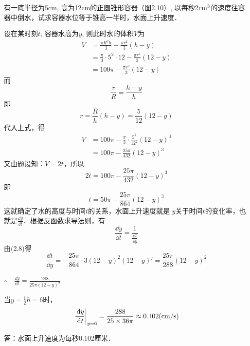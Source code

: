 \begin{example}
有一底半径为5cm, 高为12cm的正圆锥形容器（图2.10）, 以每秒2$\rm cm^3$的速度往容器中倒水，试求容器水位等于锥高一半时，水面上升速度．
\end{example}


\begin{solution}
    设在某时刻$t$, 容器水高为$y$, 则此时水的体积$V$为
 \begin{align*}
     V&=\frac{\pi R^2h}{3}-\frac{\pi r^2}{3}(h-y)\\
     &=\frac{\pi}{3}\cdot 5^2\cdot 12-\frac{\pi r^2}{3}(12-y)\\
     &=100\pi-\frac{\pi r^2}{3}(12-y)
 \end{align*}
而
\[\frac{r}{R}=\frac{h-y}{h}\]
即
\[r=\frac{R}{h}(h-y)=\frac{5}{12}(12-y)\]
代入上式，得
\begin{align*}
    V&=100\pi-\frac{\pi}{3}\cdot \frac{5^2}{12^2}(12-y)^3\\
    &=100\pi-\frac{25\pi}{432}(12-y)^3
\end{align*}
又由题设知：$V=2t$，所以
\[2t=100\pi-\frac{25\pi}{432}(12-y)^3\]
即
\begin{equation}
    t=50\pi-\frac{25\pi}{864}(12-y)^3
\end{equation}
这就确定了水的高度与时间$t$的关系，水面上升速度就是
$y$关于时间$t$的变化率，也就是$\frac{\dd y}{\dd t}$．根据反函数求导法则，有
\[\frac{\dd y}{\dd t}=\frac{1}{\frac{\dd t}{\dd y}}\]
由(2.8)得
\[\frac{\dd t}{\dd y}=-\frac{25\pi}{864}\cdot 3(12-y)^2(12-y)'=\frac{25\pi}{288}(12-y)^2\]

$\therefore\quad \frac{\dd y}{\dd t}=\frac{288}{25\pi(12-y)^2}$

当$y=\frac{1}{2}h=6$时，
\[\left.\dfrac{\,{\rm d} y}{\,{\rm d} t}\right|_{y=6}=\dfrac{288}{25\times 36\pi}\approx 0.102({\rm cm/s})\]

答：水面上升速度为每秒0.102厘米．
\end{solution}

